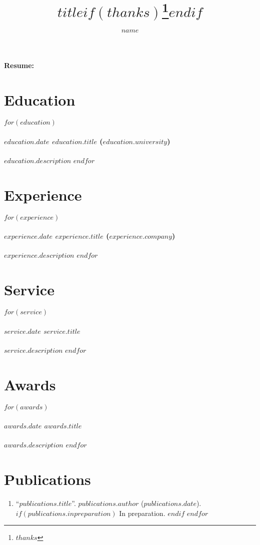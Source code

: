 \documentclass[10pt,twocolumn]{article}
\title{$title$$if(thanks)$\thanks{$thanks$}$endif$}
\author{$name$}
\date{}
\makeatletter
\renewcommand\maketitle{
    {\raggedright\begin{center}%
      {\Large\bfseries Resume: \@author}\\[4ex]
    \end{center}}
  }
\makeatother
\begin{document}
\maketitle
\thispagestyle{empty}

\section*{Education}
$for(education)$
\paragraph{$education.date$ $education.title$ ($education.university$)}
$education.description$
$endfor$

\section*{Experience}
$for(experience)$
\paragraph{$experience.date$ $experience.title$ ($experience.company$)}
$experience.description$
$endfor$

\section*{Service}
$for(service)$
\paragraph{$service.date$ $service.title$}
$service.description$
$endfor$

\section*{Awards}
$for(awards)$
\paragraph{$awards.date$ $awards.title$}
$awards.description$
$endfor$

\section*{Publications}
\begin{enumerate}
$for(publications)$
\item ``\href{$publications.link$}{$publications.title$}''. $publications.author$ ($publications.date$).
$if(publications.inpreparation)$
In preparation.
$endif$
$endfor$
\end{enumerate}
\end{document}
